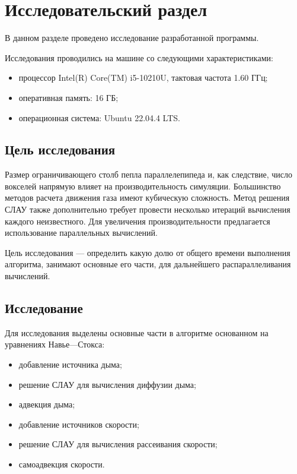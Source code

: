 \chapter{Исследовательский раздел}
В данном разделе проведено исследование разработанной программы.

Исследования проводились на машине со следующими характеристиками:
\begin{itemize}[label=---]
	\item процессор Intel(R) Core(TM) i5-10210U, тактовая частота 1.60 ГГц;
	\item оперативная память: 16 ГБ;
	\item операционная система: Ubuntu 22.04.4 LTS.
\end{itemize}

\section{Цель исследования}

Размер ограничивающего столб пепла параллелепипеда и, как следствие, число вокселей напрямую влияет на производительность симуляции. Большинство методов расчета движения газа имеют кубическую сложность. Метод решения СЛАУ также дополнительно требует провести несколько итераций вычисления каждого неизвестного. Для увеличения производительности предлагается~\cite{norway} использование параллельных вычислений.

Цель исследования --- определить какую долю от общего времени выполнения алгоритма, занимают основные его части, для дальнейшего распараллеливания вычислений.

\section{Исследование}

Для исследования выделены основные части в алгоритме основанном на уравнениях Навье---Стокса:
\begin{itemize}
	\item добавление источника дыма;
	\item решение СЛАУ для вычисления диффузии дыма;
	\item адвекция дыма;
	\item добавление источников скорости;
	\item решение СЛАУ для вычисления рассеивания скорости;
	\item самоадвекция скорости.
\end{itemize}


